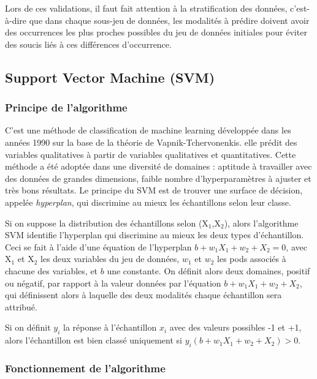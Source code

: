 \documentclass[
]{article}
\begin{document}
Lors de ces validations, il faut fait attention à la stratification des
données, c'est-à-dire que dans chaque sous-jeu de données, les modalités
à prédire doivent avoir des occurrences les plus proches possibles du
jeu de données initiales pour éviter des soucis liés à ces différences
d'occurrence.

\hypertarget{support-vector-machine-svm}{%
\subsection{Support Vector Machine
(SVM)}\label{support-vector-machine-svm}}

\hypertarget{principe-de-lalgorithme}{%
\subsubsection{Principe de l'algorithme}\label{principe-de-lalgorithme}}

C'est une méthode de classification de machine learning développée dans
les années 1990 sur la base de la théorie de Vapnik-Tchervonenkis. elle
prédit des variables qualitatives à partir de variables qualitatives et
quantitatives. Cette méthode a été adoptée dans une diversité de
domaines : aptitude à travailler avec des données de grandes dimensions,
faible nombre d'hyperparamètres à ajuster et très bons résultats. Le
principe du SVM est de trouver une surface de décision, appelée
\emph{hyperplan}, qui discrimine au mieux les échantillons selon leur
classe.

Si on suppose la distribution des échantillons selon (X\(_1\),X\(_2\)),
alors l'algorithme SVM identifie l'hyperplan qui discrimine au mieux les
deux types d'échantillon. Ceci se fait à l'aide d'une équation de
l'hyperplan \(b+w_1X_1+w_2+X_2=0\), avec X\(_1\) et X\(_2\) les deux
variables du jeu de données, \(w_1\) et \(w_2\) les pods associés à
chacune des variables, et \(b\) une constante. On définit alors deux
domaines, positif ou négatif, par rapport à la valeur données par
l'équation \(b+w_1X_1+w_2+X_2\), qui définissent alors à laquelle des
deux modalités chaque échantillon sera attribué.

Si on définit \(y_i\) la réponse à l'échantillon \(x_i\) avec des
valeurs possibles -1 et +1, alors l'échantillon est bien classé
uniquement si \(y_i(b+w_1X_1+w_2+X_2) > 0\).

\hypertarget{fonctionnement-de-lalgorithme}{%
\subsubsection{Fonctionnement de
l'algorithme}\label{fonctionnement-de-lalgorithme}}
\end{document}
